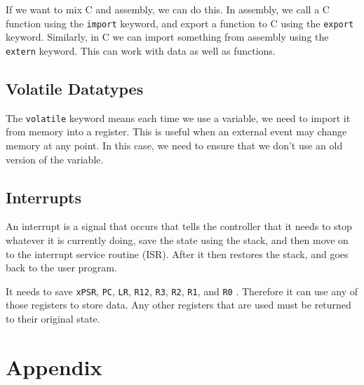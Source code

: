 \documentclass[12pt,letterpaper]{article} \usepackage{amsmath} \usepackage{graphicx} \usepackage[margin=1in]{geometry} \usepackage{longtable}  \usepackage{amssymb}
\begin{document}
	If we want to mix C and assembly, we can do this. In assembly, we call a C function using the \verb*|import| keyword, and export a function to C using the \verb*|export| keyword. Similarly, in C we can import something from assembly using the \verb*|extern| keyword. This can work with data as well as functions. 
	
	\subsection{Volatile Datatypes}
	The \verb|volatile| keyword means each time we use a variable, we need to import it from memory into a register. This is useful when an external event may change memory at any point. In this case, we need to ensure that we don't use an old version of the variable.
	
	\subsection{Interrupts}
	An interrupt is a signal that occurs that tells the controller that it needs to stop whatever it is currently doing, save the state using the stack, and then move on to the interrupt service routine (ISR). After it then restores the stack, and goes back to the user program.
	
	It needs to save \verb*|xPSR|, \verb*|PC|, \verb*|LR|, \verb*|R12|, \verb*|R3|, \verb*|R2|, \verb*|R1|, and \verb*|R0| . Therefore it can use any of those registers to store data. Any other registers that are used must be returned to their original state. 
	
	\newpage 
	\section{Appendix}
	
	
	
	
	
\end{document}
